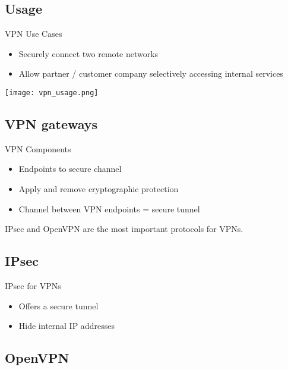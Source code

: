 \subsection{Usage}

\begin{concept}{VPN Use Cases}\\
    \begin{itemize}
        \item Securely connect two remote networks
        \item Allow partner / customer company selectively accessing internal services
    \end{itemize}
\end{concept}

\texttt{[image: vpn\_usage.png]}

\subsection{VPN gateways}

\begin{concept}{VPN Components}\\
    \begin{itemize}
        \item Endpoints to secure channel
        \item Apply and remove cryptographic protection
        \item Channel between VPN endpoints = secure tunnel
    \end{itemize}
    
    IPsec and OpenVPN are the most important protocols for VPNs.
\end{concept}

\subsection{IPsec}

\begin{definition}{IPsec for VPNs}\\
    \begin{itemize}
        \item Offers a secure tunnel
        \item Hide internal IP addresses
    \end{itemize}
\end{definition}

\subsection{OpenVPN}

